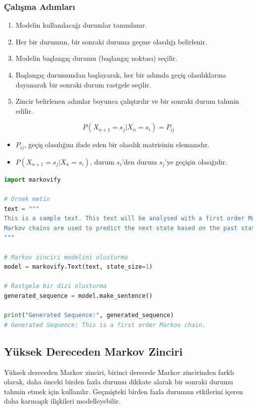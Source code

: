 \subsubsection{Çalışma Adımları}
\begin{enumerate}
    \item Modelin kullanılacağı durumlar tanımlanır.
    \item Her bir durumun, bir sonraki duruma geçme olasılığı belirlenir.
    \item Modelin başlangıç durumu (başlangıç noktası) seçilir.
    \item Başlangıç durumundan başlayarak, her bir adımda geçiş olasılıklarına dayanarak bir sonraki durum rastgele seçilir.
    \item Zincir belirlenen adımlar boyunca çalıştırılır ve bir sonraki durum tahmin edilir.
\end{enumerate}

\[P(X_{n+1} = s_j | X_n = s_i) = P_{ij}\]

\begin{itemize}
    \item $P_{ij}$, geçiş olasılığını ifade eden bir olasılık matrisinin elemanıdır.
    \item $P(X_{n+1} = s_j | X_n = s_i)$, durum  $s_{i}$'den durum $s_{j}$'ye geçişin olasığıdır.
\end{itemize}

\begin{lstlisting}[language=Python]
import markovify

# Ornek metin
text = """
This is a sample text. This text will be analysed with a first order Markov chain. 
Markov chains are used to predict the next state based on the past state.
"""

# Markov zinciri modelini olusturma
model = markovify.Text(text, state_size=1)

# Rastgele bir dizi olusturma
generated_sequence = model.make_sentence()

print("Generated Sequence:", generated_sequence)
# Generated Sequence: This is a first order Markov chain.   
\end{lstlisting}

\subsection{Yüksek Dereceden Markov Zinciri}
Yüksek dereceden Markov zinciri, birinci derecede Markov zincirinden farklı olarak, daha önceki birden fazla durumu dikkate alarak bir sonraki durumu tahmin etmek için kullanılır. Geçmişteki birden fazla durumun etkilerini içeren daha karmaşık ilişkileri modelleyebilir. 

